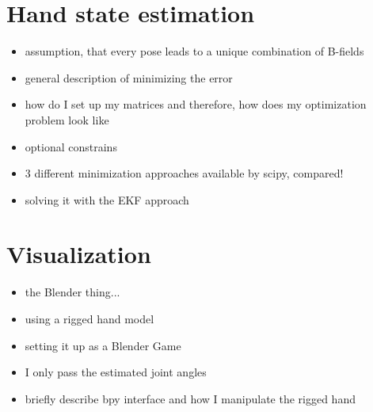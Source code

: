 \section{Hand state estimation} \label{sec:estimation}

\begin{itemize}
\item assumption, that every pose leads to a unique combination of B-fields
\item general description of minimizing the error
\item how do I set up my matrices and therefore, how does my optimization problem look like
\item optional constrains
\item 3 different minimization approaches available by scipy, compared!
\item solving it with the EKF approach
\end{itemize}


\section{Visualization} \label{sec:visual}

\begin{itemize}
\item the Blender thing...
\item using a rigged hand model
\item setting it up as a Blender Game
\item I only pass the estimated joint angles
\item briefly describe bpy interface and how I manipulate the rigged hand
\end{itemize}




